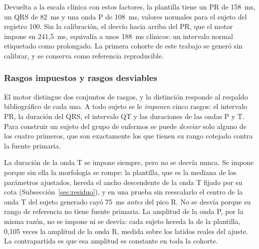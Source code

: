 \begin{spacing}{1.5}
\begin{table}[H]
\centering
{}
\caption{Factores entre la convención de $k = 2$ anchos y la medición clínica, estimados sobre los 150 latidos medianos de PTB-XL+ más parecidos a la plantilla, y rangos de Palhares et al.\ (hombres de 60 a 69 años) llevados a la escala del motor. La columna de vecinos muestra la sensibilidad del factor al número de latidos empleados.}
\label{tab:calibracion}
\end{table}

Devuelta a la escala clínica con estos factores, la plantilla tiene un PR de 158~ms, un QRS de 82~ms y una onda P de 108~ms, valores normales para el sujeto del registro 100. Sin la calibración, el desvío hacia arriba del PR, que el motor impone en 241,5~ms, equivalía a unos 188~ms clínicos: un intervalo normal etiquetado como prolongado. La primera cohorte de este trabajo se generó sin calibrar, y se conserva como referencia reproducible.

\subsubsection{Rasgos impuestos y rasgos desviables}

El motor distingue dos conjuntos de rasgos, y la distinción responde al respaldo bibliográfico de cada uno. A todo sujeto se le \emph{imponen} cinco rasgos: el intervalo PR, la duración del QRS, el intervalo QT y las duraciones de las ondas P y T. Para construir un sujeto del grupo de enfermos se puede \emph{desviar} solo alguno de los cuatro primeros, que son exactamente los que tienen su rango cotejado contra la fuente primaria.

La duración de la onda T se impone siempre, pero no se desvía nunca. Se impone porque sin ella la morfología se rompe: la plantilla, que es la mediana de los parámetros ajustados, hereda el ancho descendente de la onda T fijado por su cota (Subsección~\ref{sec:residuo}), y en una prueba sin reescalarlo el centro de la onda T del sujeto generado cayó 75~ms \emph{antes} del pico R. No se desvía porque su rango de referencia no tiene fuente primaria. La amplitud de la onda P, por la misma razón, no se impone ni se desvía: cada sujeto hereda la de la plantilla, 0,105 veces la amplitud de la onda R, medida sobre los latidos reales del ajuste. La contrapartida es que esa amplitud es constante en toda la cohorte.


\end{spacing}

